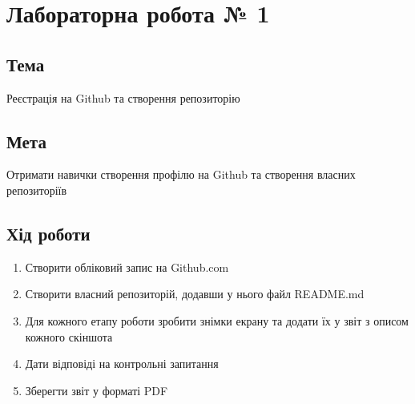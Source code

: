 \documentclass[14pt,a4paper,oneside,draft]{report}
\begin{document}
\chapter{Лабораторна робота № 1}
\section*{Тема} 
Реєстрація на Github та створення репозиторію
\section*{Мета}
Отримати навички створення профілю на Github та створення власних репозиторіїв

\section{Хід роботи}
\begin{enumerate}
	\item Створити обліковий запис на Github.com
	\item Створити власний репозиторій, додавши у нього файл README.md
	\item Для кожного етапу роботи зробити знімки екрану та додати їх у звіт з описом кожного скіншота
	\item Дати відповіді на контрольні запитання
	\item Зберегти звіт у форматі PDF
\end{enumerate}
\end{document}
